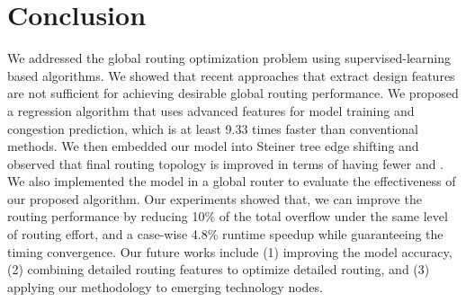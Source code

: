 \section{Conclusion}
\label{sec:conlu}

We addressed the global routing optimization problem using supervised-learning based algorithms.
We showed that recent approaches that extract design features are not sufficient for achieving desirable global routing performance.
We proposed a regression algorithm that uses advanced features for model training and congestion prediction, which is at least 9.33 times faster than conventional methods.
We then embedded our model into Steiner tree edge shifting and observed that final  routing topology is improved in terms of having fewer  and .
We also implemented the model in a global router to evaluate the effectiveness of our proposed algorithm.
Our experiments showed that, we can improve the routing performance by reducing 10\% of the total overflow under the same level of routing effort, and a case-wise 4.8\% runtime speedup while guaranteeing the timing convergence.
Our future works include (1) improving the model accuracy, (2) combining  detailed routing features to optimize detailed routing, and (3) applying our methodology to emerging technology nodes.
